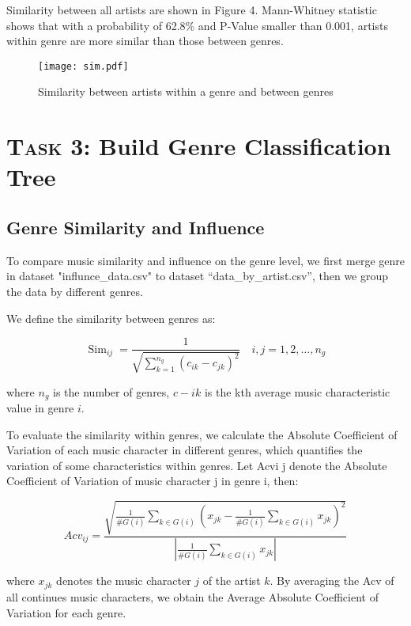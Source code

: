 \documentclass[12pt]{article}  %
\begin{document}
	Similarity between all artists are shown in Figure 4. Mann-Whitney statistic shows that with a probability of 62.8\% and P-Value smaller than 0.001, artists within genre are more similar than those between genres.
	\clearpage
	
	\begin{figure}[htbp]
		\centering
		\texttt{[image: sim.pdf]} 	%
		\caption{Similarity between artists within a genre and between genres}		%
		\label{fig:sim}							%
	\end{figure}
	
	
	
	\section{\textsc{Task 3: }Build Genre Classification Tree}
	\subsection{Genre Similarity and Influence}
	
	To compare music similarity and influence on the genre level, we first merge genre in dataset "influnce\_data.csv" to dataset “data\_by\_artist.csv”, then we group the data by different genres.
	
	We define the similarity between genres as:
	
	\begin{equation}
		\operatorname{Sim}_{i j}=\frac{1}{\sqrt{\sum_{k=1}^{n_{g}}\left(c_{i k}-c_{j k}\right)^{2}}} \quad i, j=1,2, \ldots, n_{g}
	\end{equation}
	
	where $ n_g $ is the number of genres, $ c-{ik} $ is the kth average music characteristic value in genre $ i $.
	
	To evaluate the similarity within genres, we calculate the Absolute Coefficient of Variation
	of each music character in different genres, which quantifies the variation of some characteristics within genres. Let Acvi j denote the Absolute Coefficient of Variation of music character j
	in genre i, then:
	
	\begin{equation}
		A c v_{i j}=\frac{\sqrt{\frac{1}{\# G(i)} \sum_{k \in G(i)}\left(x_{j k}-\frac{1}{\# G(i)} \sum_{k \in G(i)} x_{j k}\right)^{2}}}{\left|\frac{1}{\# G(i)} \sum_{k \in G(i)} x_{j k}\right|}
	\end{equation}
	
	where $ x_{jk} $ denotes the music character $ j $ of the artist $ k $. By averaging the Acv of all continues music characters, we obtain the Average Absolute Coefficient of Variation for each genre.
	
\end{document}
